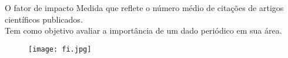 \begin{frame}[t]{O fator de impacto}
    \large{Medida que reflete o número médio de citações de artigos científicos publicados.}\\

    \vspace*{0.2cm}
    Tem como objetivo avaliar a importância de um dado periódico em sua área.

    \begin{figure}
        \texttt{[image: fi.jpg]}
    \end{figure}
\end{frame}
